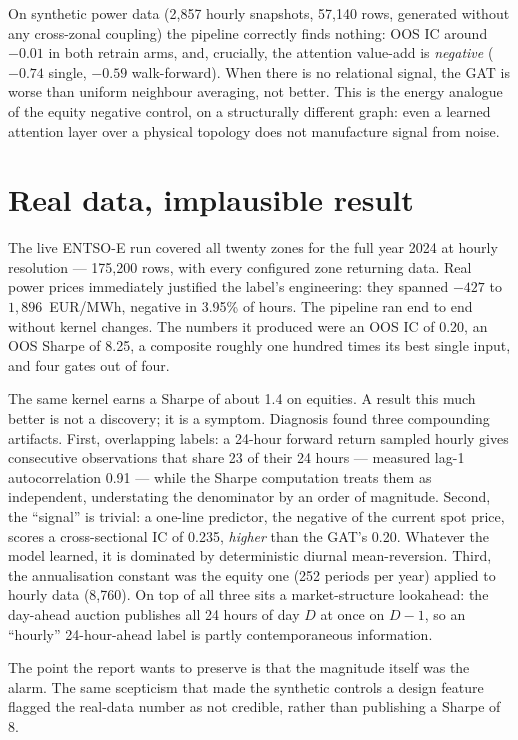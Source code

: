 On synthetic power data (2{,}857 hourly snapshots, 57{,}140 rows,
generated without any cross-zonal coupling) the pipeline correctly finds
nothing: OOS IC around $-0.01$ in both retrain arms, and, crucially, the
attention value-add is \emph{negative} ($-0.74$ single, $-0.59$
walk-forward). When there is no relational signal, the GAT is worse than
uniform neighbour averaging, not better. This is the energy analogue of
the equity negative control, on a structurally different graph: even a
learned attention layer over a physical topology does not manufacture
signal from noise.

\section{Real data, implausible result}
\label{sec:en-artifact}

The live ENTSO-E run covered all twenty zones for the full year 2024 at
hourly resolution --- 175{,}200 rows, with every configured zone
returning data. Real power prices immediately justified the label's
engineering: they spanned $-427$ to $1{,}896$~EUR/MWh, negative in 3.95\%
of hours. The pipeline ran end to end without kernel changes. The
numbers it produced were an OOS IC of 0.20, an OOS Sharpe of 8.25, a
composite roughly one hundred times its best single input, and four
gates out of four.

The same kernel earns a Sharpe of about 1.4 on equities. A result this
much better is not a discovery; it is a symptom. Diagnosis found three
compounding artifacts. First, overlapping labels: a 24-hour forward
return sampled hourly gives consecutive observations that share 23 of
their 24 hours --- measured lag-1 autocorrelation 0.91 --- while the
Sharpe computation treats them as independent, understating the
denominator by an order of magnitude. Second, the ``signal'' is trivial:
a one-line predictor, the negative of the current spot price, scores a
cross-sectional IC of 0.235, \emph{higher} than the GAT's 0.20. Whatever
the model learned, it is dominated by deterministic diurnal
mean-reversion. Third, the annualisation constant was the equity one
(252 periods per year) applied to hourly data (8{,}760). On top of all
three sits a market-structure lookahead: the day-ahead auction publishes
all 24 hours of day $D$ at once on $D-1$, so an ``hourly'' 24-hour-ahead
label is partly contemporaneous information.

The point the report wants to preserve is that the magnitude itself was
the alarm. The same scepticism that made the synthetic controls a design
feature flagged the real-data number as not credible, rather than
publishing a Sharpe of 8.


